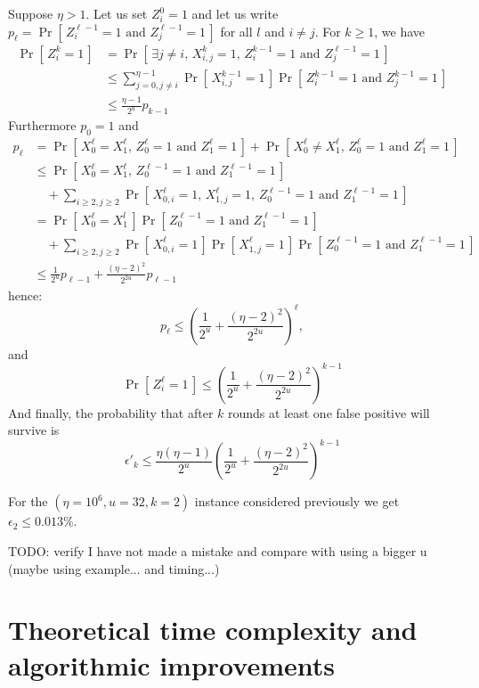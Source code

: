 \documentclass[11pt]{llncs}
\newcommand{\Prob}[1]{{\Pr\left[\,{#1}\,\right]}}
\begin{document}
Suppose $\eta > 1$.
Let us set $Z^0_i = 1$ and let us write $p_\ell = \Prob{Z^{\ell-1}_{i} = 1 \text{ and } Z^{\ell-1}_{j} = 1} $ for all $l$ and $i \neq j$.
For $k \ge 1$, we have
\begin{align*}
\Prob{Z^k_i=1} &= \Prob{\exists j\neq i \text{, } X^k_{i,j} = 1 \text{, } Z^{k-1}_{i} = 1  \text{ and } Z^{\ell-1}_{j} = 1}  \\
&\le \sum_{j=0, j\neq i}^{\eta-1} \Prob{X^{k-1}_{i,j} = 1} \Prob{Z^{k-1}_{i} = 1 \text{ and } Z^{k-1}_{j} = 1}  \\
&\le \frac{\eta-1}{2^u} p_{k-1}
\end{align*}
Furthermore $p_0 = 1$ and
\begin{align*}
p_\ell &= \Prob{X^{\ell}_0 = X^{\ell}_1 \text{, } Z^{\ell}_{0} = 1 \text{ and } Z^{\ell}_{1} = 1}
  + \Prob{X^{\ell}_0 \neq X^{\ell}_1 \text{, } Z^{\ell}_{0} = 1 \text{ and } Z^{\ell}_{1} = 1} \\
&\le \Prob{X^{\ell}_0 = X^{\ell}_1 \text{, } Z^{\ell-1}_{0} = 1 \text{ and } Z^{\ell-1}_{1} = 1} \\
  &\quad+ \sum_{i \ge 2, j \ge 2} \Prob{X^\ell_{0,i} = 1 \text{, } X^\ell_{1,j} = 1 \text{, } Z^{\ell-1}_{0} = 1 \text{ and } Z^{\ell-1}_{1} = 1} \\
&= \Prob{X^{\ell}_0 = X^{l}_1} \Prob{Z^{\ell-1}_{0} = 1 \text{ and } Z^{\ell-1}_{1} = 1} \\
  &\quad+ \sum_{i \ge 2, j \ge 2} \Prob{X^\ell_{0,i} = 1} \Prob{X^\ell_{1,j} = 1} \Prob{Z^{\ell-1}_{0} = 1 \text{ and } Z^{\ell-1}_{1} = 1} \\
&\le \frac{1}{2^u} p_{\ell-1} + \frac{(\eta-2)^2}{2^{2u}} p_{\ell-1}
\end{align*}
hence:
\[ p_\ell \le \left( \frac{1}{2^u} + \frac{(\eta-2)^2}{2^{2u}} \right)^\ell, \]
and
\[ \Prob{Z^\ell_i=1} \le \left( \frac{1}{2^u} + \frac{(\eta-2)^2}{2^{2u}} \right)^{k-1} \]
And finally, the probability that after $k$ rounds at least one false positive will survive is
\[
\epsilon'_k \le \frac{\eta(\eta-1)}{2^u} \left( \frac{1}{2^u} + \frac{(\eta-2)^2}{2^{2u}} \right)^{k-1}
\]

For the $(\eta=10^6,u=32,k=2)$ instance considered previously we get $\epsilon_2 \le 0.013\%$.

TODO: verify I have not made a mistake and compare with using a bigger u (maybe using example... and timing...)

\section{Theoretical time complexity and algorithmic improvements}
\end{document}
